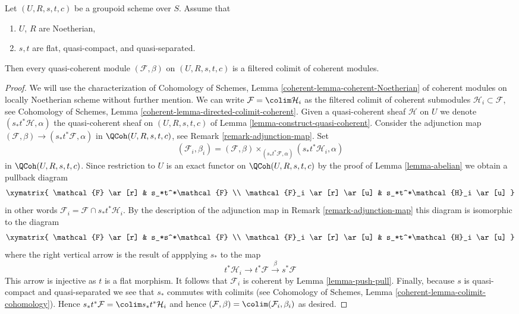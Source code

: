 \begin{lemma}
\label{lemma-colimit-coherent}
Let $(U, R, s, t, c)$ be a groupoid scheme over $S$.
Assume that
\begin{enumerate}
\item $U$, $R$ are Noetherian,
\item $s, t$ are flat, quasi-compact, and quasi-separated.
\end{enumerate}
Then every quasi-coherent module $(\mathcal{F}, \beta)$ on $(U, R, s, t, c)$
is a filtered colimit of coherent modules.
\end{lemma}

\begin{proof}
We will use the characterization of Cohomology of Schemes, Lemma
\ref{coherent-lemma-coherent-Noetherian} of coherent modules on locally
Noetherian scheme without further mention. We can write
$\mathcal{F} = \colim \mathcal{H}_i$ as the filtered colimit
of coherent submodules $\mathcal{H}_i \subset \mathcal{F}$, see
Cohomology of Schemes, Lemma \ref{coherent-lemma-directed-colimit-coherent}.
Given a quasi-coherent sheaf $\mathcal{H}$ on $U$ we denote
$(s_*t^*\mathcal{H}, \alpha)$ the quasi-coherent sheaf on $(U, R, s, t, c)$ of
Lemma \ref{lemma-construct-quasi-coherent}. Consider the adjunction map
$(\mathcal{F}, \beta) \to (s_*t^*\mathcal{F}, \alpha)$ in
$\QCoh(U, R, s, t, c)$, see Remark \ref{remark-adjunction-map}.
Set
$$
(\mathcal{F}_i, \beta_i) =
(\mathcal{F}, \beta)
\times_{(s_*t^*\mathcal{F}, \alpha)}
(s_*t^*\mathcal{H}_i, \alpha)
$$
in $\QCoh(U, R, s, t, c)$. Since restriction to $U$ is an exact functor
on $\QCoh(U, R, s, t, c)$  by the proof of Lemma \ref{lemma-abelian}
we obtain a pullback diagram
$$
\xymatrix{
\mathcal{F} \ar[r] & s_*t^*\mathcal{F} \\
\mathcal{F}_i \ar[r] \ar[u] & s_*t^*\mathcal{H}_i \ar[u]
}
$$
in other words $\mathcal{F}_i = \mathcal{F} \cap s_*t^*\mathcal{H}_i$.
By the description of the adjunction map in Remark \ref{remark-adjunction-map}
this diagram is isomorphic to the diagram
$$
\xymatrix{
\mathcal{F} \ar[r] & s_*s^*\mathcal{F} \\
\mathcal{F}_i \ar[r] \ar[u] & s_*t^*\mathcal{H}_i \ar[u]
}
$$
where the right vertical arrow is the result of appplying $s_*$ to the map
$$
t^*\mathcal{H}_i \to t^*\mathcal{F} \xrightarrow{\beta} s^*\mathcal{F}
$$
This arrow is injective as $t$ is a flat morphism. It follows that
$\mathcal{F}_i$ is coherent by Lemma \ref{lemma-push-pull}.
Finally, because $s$ is quasi-compact and quasi-separated we see that
$s_*$ commutes with colimits (see
Cohomology of Schemes, Lemma \ref{coherent-lemma-colimit-cohomology}).
Hence $s_*t^*\mathcal{F} = \colim s_*t^*\mathcal{H}_i$ and hence
$(\mathcal{F}, \beta) = \colim (\mathcal{F}_i, \beta_i)$ as desired.
\end{proof}

